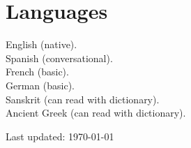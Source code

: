 \documentclass[11pt, letterpaper]{article} %
\newcommand{\years}[1]{\marginnote{\scriptsize #1}} %
\begin{document}


\section*{Languages}
\years{}English (native).\\
\years{}Spanish (conversational).\\
\years{}French (basic). \\
\years{}German (basic). \\
\years{}Sanskrit (can read with dictionary).\\
\years{}Ancient Greek (can read with dictionary).






\vfill{} %


\begin{center}
{\scriptsize Last updated: \today }
\end{center}

\end{document}

